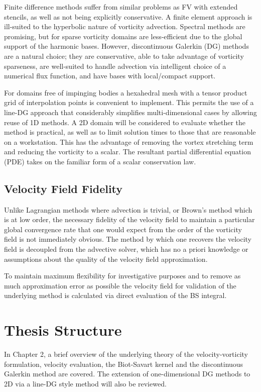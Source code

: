 \documentclass[letterpaper,12pt]{report}
\begin{document}
Finite difference methods suffer from similar problems as FV with extended stencils, as well as not being explicitly conservative. A finite element approach is ill-suited to the hyperbolic nature of vorticity advection. Spectral methods are promising, but for sparse vorticity domains are less-efficient due to the global support of the harmonic bases. However, discontinuous Galerkin (DG) methods are a natural choice; they are conservative, able to take advantage of vorticity sparseness, are well-suited to handle advection via intelligent choice of a numerical flux function, and have bases with local/compact support.

For domains free of impinging bodies a hexahedral mesh with a tensor product grid of interpolation points is convenient to implement. This permits the use of a line-DG \cite{Perlman1985} approach that considerably simplifies multi-dimensional cases by allowing reuse of 1D methods. A 2D domain will be considered to evaluate whether the method is practical, as well as to limit solution times to those that are reasonable on a workstation. This has the advantage of removing the vortex stretching term and reducing the vorticity to a scalar. The resultant partial differential equation (PDE) takes on the familiar form of a scalar conservation law.

\subsection{Velocity Field Fidelity}
Unlike Lagrangian methods where advection is trivial, or Brown's method which is at low order, the necessary fidelity of the velocity field to maintain a particular global convergence rate that one would expect from the order of the vorticity field is not immediately obvious. The method by which one recovers the velocity field is decoupled from the advective solver, which has no a priori knowledge or assumptions about the quality of the velocity field approximation. 

To maintain maximum flexibility for investigative purposes and to remove as much approximation error as possible the velocity field for validation of the underlying method is calculated via direct evaluation of the BS integral.

\section{Thesis Structure}
In Chapter 2, a brief overview of the underlying theory of the velocity-vorticity formulation, velocity evaluation, the Biot-Savart  kernel and the discontinuous Galerkin method are covered. The extension of one-dimensional DG methods to 2D via a line-DG style method will also be reviewed. 
\end{document}
